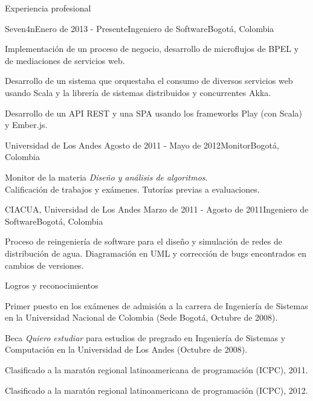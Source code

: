 \documentclass{resume} %
\def\uniandes{Universidad de Los Andes }
\begin{document}
\begin{rSection}{Experiencia profesional}

\begin{rSubsection}{Seven4n}{Enero de 2013 - Presente}{Ingeniero de Software}{Bogot\'a, Colombia}
\item Implementaci\'on de un proceso de negocio, desarrollo de microflujos de BPEL y de mediaciones de servicios web.
\item Desarrollo de un sistema que orquestaba el consumo de diversos servicios web usando Scala y la librer\'ia de sistemas distribuidos y concurrentes Akka.
\item Desarrollo de un API REST y una SPA usando los frameworks Play (con Scala) y Ember.js. 
\end{rSubsection}


\begin{rSubsection}{\uniandes}{Agosto de 2011 - Mayo de 2012}{Monitor}{Bogot\'a, Colombia}
\item Monitor de la materia \textit{Dise\~{n}o y an\'alisis de algoritmos}.\\
Calificaci\'on de trabajos y ex\'amenes. Tutor\'ias previas a evaluaciones.
\end{rSubsection}


\begin{rSubsection}{CIACUA, \uniandes}{Marzo de 2011 - Agosto de 2011}{Ingeniero de Software}{Bogot\'a, Colombia}
\item Proceso de reingenier\'ia de software para el dise\~{n}o y simulaci\'on de redes de distribuci\'on de agua. Diagramaci\'on en UML y correcci\'on de bugs encontrados en cambios de versiones.
\end{rSubsection}

\end{rSection}

\begin{rSection}{Logros y reconocimientos}
\begin{rSubsection}{}{}{}{}
\item Primer puesto en los ex\'amenes de admisi\'on a la carrera de Ingenier\'ia de Sistemas en la Universidad Nacional de Colombia (Sede Bogot\'a, Octubre de 2008).
\item Beca \textsl{Quiero estudiar} para estudios de pregrado en Ingenier\'ia de Sistemas y Computaci\'on en la Universidad de Los Andes (Octubre de 2008).
\item Clasificado a la marat\'on regional latinoamericana de programaci\'on (ICPC), 2011.
\item Clasificado a la marat\'on regional latinoamericana de programaci\'on (ICPC), 2012.
\end{rSubsection}
\end{rSection}
\end{document}
